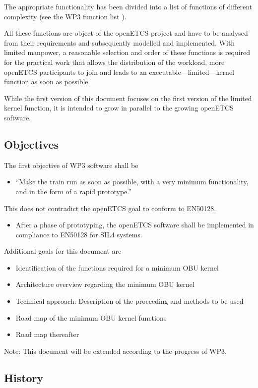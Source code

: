 \documentclass{template/openetcs_article}
\begin{document}
The appropriate functionality has been divided into a list of functions of different complexity (see the WP3 function list \cite{functions}).

All these functions are object of the openETCS project and have to be analysed from their requirements and subsequently modelled and implemented. With limited manpower, a reasonable selection and order of these functions is required for the practical work that allows the distribution of the workload, more openETCS participants to join and leads to an executable---limited---kernel function as soon as possible. 

While the first version of this document focuses on the first version of the limited kernel function, it is intended to grow in parallel to the growing openETCS software.


\subsection{Objectives}
\label{sec:Objectives}



The first objective of WP3 software shall be
\begin{itemize}
	\item ``Make the train run as soon as possible, with a very minimum functionality, and in the form of a rapid prototype.''
\end{itemize}
This does not contradict the openETCS goal to conform to EN50128.
\begin{itemize}
	\item After a phase of prototyping, the openETCS software shall be implemented in compliance to EN50128 for SIL4 systems.
\end{itemize}
Additional goals for this document are
\begin{itemize}
	\item Identification of the functions required for a minimum OBU kernel
	\item Architecture overview regarding the minimum OBU kernel
	\item Technical approach: Description of the proceeding and methods to be used
	\item Road map of the minimum OBU kernel functions
	\item Road map thereafter
\end{itemize}

Note: This document will be extended according to the progress of WP3. 


\subsection{History}
\end{document}
